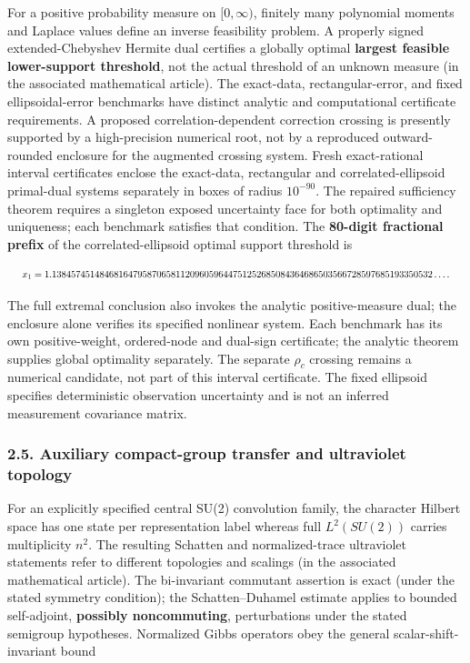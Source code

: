 \documentclass[
  10pt,
  a4paper,
]{article}
\begin{document}
For a positive probability measure on \([0,\infty)\), finitely many polynomial moments and Laplace values define an inverse feasibility problem. A properly signed extended-Chebyshev Hermite dual certifies a globally optimal \textbf{largest feasible lower-support threshold}, not the actual threshold of an unknown measure (in the associated mathematical article). The exact-data, rectangular-error, and fixed ellipsoidal-error benchmarks have distinct analytic and computational certificate requirements. A proposed correlation-dependent correction crossing is presently supported by a high-precision numerical root, not by a reproduced outward-rounded enclosure for the augmented crossing system. Fresh exact-rational interval certificates enclose the exact-data, rectangular and correlated-ellipsoid primal-dual systems separately in boxes of radius \(10^{-90}\). The repaired sufficiency theorem requires a singleton exposed uncertainty face for both optimality and uniqueness; each benchmark satisfies that condition. The \textbf{80-digit fractional prefix} of the correlated-ellipsoid optimal support threshold is

\[
\resizebox{0.98\linewidth}{!}{$x_1=1.13845745148468164795870658112096059644751252685084364686503566728597685193350532\ldots.$}
\]

The full extremal conclusion also invokes the analytic positive-measure dual; the enclosure alone verifies its specified nonlinear system. Each benchmark has its own positive-weight, ordered-node and dual-sign certificate; the analytic theorem supplies global optimality separately. The separate \(\rho_c\) crossing remains a numerical candidate, not part of this interval certificate. The fixed ellipsoid specifies deterministic observation uncertainty and is not an inferred measurement covariance matrix.

\subsubsection{2.5. Auxiliary compact-group transfer and ultraviolet topology}\label{auxiliary-compact-group-transfer-and-ultraviolet-topology}

For an explicitly specified central SU(2) convolution family, the character Hilbert space has one state per representation label whereas full \(L^2(SU(2))\) carries multiplicity \(n^2\). The resulting Schatten and normalized-trace ultraviolet statements refer to different topologies and scalings (in the associated mathematical article). The bi-invariant commutant assertion is exact (under the stated symmetry condition); the Schatten--Duhamel estimate applies to bounded self-adjoint, \textbf{possibly noncommuting}, perturbations under the stated semigroup hypotheses. Normalized Gibbs operators obey the general scalar-shift-invariant bound
\end{document}

